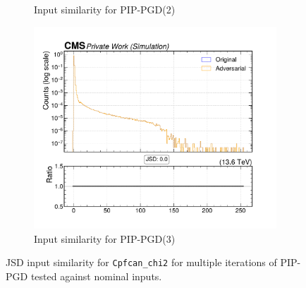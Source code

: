 \begin{figure}[htbp]
\begin{subfigure}[t]{0.32\textwidth}
    \caption*{Input similarity for PIP-PGD(2)}
  \end{subfigure}\hfill
  \begin{subfigure}[t]{0.32\textwidth}
    \includegraphics[width=\linewidth]{media/output/features/compare/combined_it_3/cmp_cpf_arr_Cpfcan_chi2.pdf}
    \caption*{Input similarity for PIP-PGD(3)}
  \end{subfigure}

  \caption*{JSD input similarity for \texttt{Cpfcan\_chi2} for multiple iterations of PIP-PGD tested against nominal inputs.}
  \label{fig:combined_input_Cpfcan_chi2}
\end{figure}

